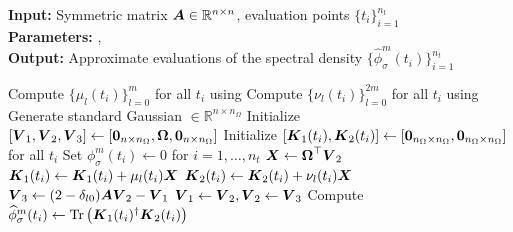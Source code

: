 \hspace*{\algorithmicindent} \textbf{Input:} Symmetric matrix $\boldsymbol{A} \in \mathbb{R}^{n \times n}$, evaluation points $\{t_i\}_{i=1}^{n_t}$ \\
\hspace*{\algorithmicindent} \textbf{Parameters:} ,  \\
\hspace*{\algorithmicindent} \textbf{Output:} Approximate evaluations of the spectral density $\{\widehat{\phi}_{\sigma}^m(t_i)\}_{i=1}^{n_t}$
\begin{algorithmic}[1]
    \State Compute $\{\mu_l(t_i)\}_{l=0}^m$ for all $t_i$ using 
    \State Compute $\{\nu_l(t_i)\}_{l=0}^{2m}$ for all $t_i$ using 
    \State Generate standard Gaussian  $\in \mathbb{R}^{n \times n_{\Omega}}$ %
    \State Initialize $[\boldsymbol{V}_1, \boldsymbol{V}_2, \boldsymbol{V}_3] \gets [\boldsymbol{0}_{n \times n_{\Omega}}, \boldsymbol{\Omega}, \boldsymbol{0}_{n \times n_{\Omega}}]$
    \State Initialize $[\boldsymbol{K}_1(t_i), \boldsymbol{K}_2(t_i)] \gets [\boldsymbol{0}_{n_{\Omega} \times n_{\Omega}}, \boldsymbol{0}_{n_{\Omega} \times n_{\Omega}}]$ for all $t_i$
    \State Set ${\phi}_{\sigma}^m(t_i) \gets 0$ for $i=1,\dots,n_t$
      \State $\boldsymbol{X} \gets \boldsymbol{\Omega}^{\top} \boldsymbol{V}_2$
            \State $\boldsymbol{K}_1(t_i) \gets \boldsymbol{K}_1(t_i) + \mu_l(t_i) \boldsymbol{X}$
        \EndIf
        \State $\boldsymbol{K}_2(t_i) \gets \boldsymbol{K}_2(t_i) + \nu_l(t_i) \boldsymbol{X}$
      \EndFor
      \State $\boldsymbol{V}_3 \gets (2 - \delta_{l0}) \boldsymbol{A} \boldsymbol{V}_2 - \boldsymbol{V}_1$ 
      \State $\boldsymbol{V}_1 \gets \boldsymbol{V}_2, \boldsymbol{V}_2 \gets \boldsymbol{V}_3$
    \EndFor
      \State Compute $\widehat{\phi}_{\sigma}^m(t_i) \gets \operatorname{Tr}\left( \boldsymbol{K}_1(t_i)^{\dagger}\boldsymbol{K}_2(t_i) \right)$ \label{lin:3-nystrom-pseudo-inverse}
    \EndFor
\end{algorithmic}
